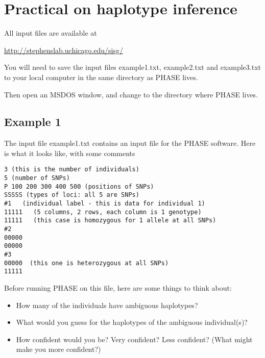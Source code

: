 
\section*{\hfil Practical on haplotype inference\hfil}

All input files are available at 

\url{http://stephenslab.uchicago.edu/sisg/}

You will need to save the input files example1.txt, example2.txt 
and example3.txt to your local computer in the same directory
as PHASE lives.

Then open an MSDOS window, and change to the directory where
PHASE lives.

\es\bs

\subsection*{Example 1}

The input file example1.txt contains an input file for the PHASE software.
Here is what it looks like, with some comments
\begin{verbatim}
3 (this is the number of individuals)
5 (number of SNPs)
P 100 200 300 400 500 (positions of SNPs) 
SSSSS (types of loci: all 5 are SNPs)
#1   (individual label - this is data for individual 1)
11111   (5 columns, 2 rows, each column is 1 genotype)
11111   (this case is homozygous for 1 allele at all SNPs)
#2
00000
00000
#3
00000  (this one is heterozygous at all SNPs)
11111
\end{verbatim}


\es\bs


Before running PHASE on this file, here are some things to think about:

\begin{itemize}
\item How many of the individuals have ambiguous haplotypes? 
\item What would you guess for the haplotypes of the ambiguous individual(s)?
\item How confident would you be? Very confident? Less confident? (What might
make you more confident?) 
\end{itemize}
\es\bs

